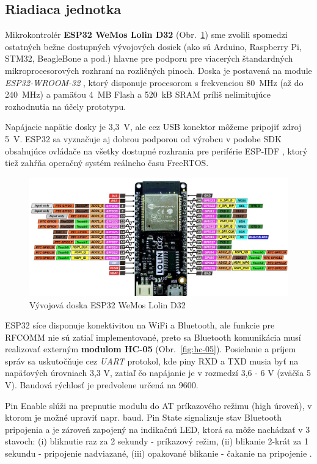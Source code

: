 \documentclass[12pt, a4paper]{article}
\begin{document}
\subsection{Riadiaca jednotka}
Mikrokontrolér \textbf{ESP32 WeMos Lolin D32} (Obr.~\ref{fig:esp32}) sme zvolili spomedzi ostatných bežne dostupných vývojových dosiek (ako sú Arduino, Raspberry Pi, STM32, BeagleBone a pod.) hlavne pre podporu pre viacerých štandardných mikroprocesorových rozhraní na rozličných pinoch. Doska je postavená na module \emph{ESP32-WROOM-32} \cite{noauthor_esp32-wroom-32_2023}, ktorý disponuje procesorom s frekvenciou 80~MHz (až do 240~MHz) a pamäťou 4~MB Flash a 520~kB SRAM príliš nelimitujúce rozhodnutia na účely prototypu.

Napájacie napätie dosky je 3,3~V, ale cez USB konektor môžeme pripojiť zdroj 5~V. ESP32 sa vyznačuje aj dobrou podporou od výrobcu v podobe SDK obsahujúce ovládače na všetky dostupné rozhrania pre periférie ESP-IDF \cite{noauthor_esp-idf_nodate}, ktorý tiež zahŕňa operačný systém reálneho času FreeRTOS.

\begin{figure}[h]
	\centering
	\includegraphics[width=\textwidth]{assets/esp32.jpg}
	\caption{Vývojová doska ESP32 WeMos Lolin D32 \cite{mischianti_esp32_2023}}
	\label{fig:esp32}
\end{figure}

ESP32 síce disponuje konektivitou na WiFi a Bluetooth, ale funkcie pre RFCOMM nie sú zatiaľ implementované, preto sa Bluetooth komunikácia musí realizovať externým \textbf{modulom HC-05} (Obr.~\ref{fig:hc-05}). Posielanie a príjem správ sa uskutočňuje cez \emph{UART} protokol, kde piny RXD a TXD musia byť na napäťových úrovniach 3,3 V, zatiaľ čo napájanie je v rozmedzí 3,6 - 6 V (zväčša 5 V). Baudová rýchlosť je predvolene určená na 9600.

Pin Enable slúži na prepnutie modulu do AT príkazového režimu (high úroveň), v ktorom je možné upraviť napr. baud. Pin State signalizuje stav Bluetooth pripojenia a je zároveň zapojený na indikačnú LED, ktorá sa môže nachádzať v 3 stavoch: (i) bliknutie raz za 2 sekundy - príkazový režim, (ii) blikanie 2-krát za 1 sekundu - pripojenie nadviazané, (iii) opakované blikanie - čakanie na pripojenie \cite{noauthor_hc-05_nodate}.
\end{document}
